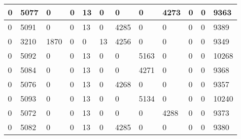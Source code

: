 \begin{longtable}{ | l | l | l | l | l | l | l | l | l | l | l || l |  }
	0 & 5077 & 0 & 0 & 13 & 0 & 0 & 0 & 4273 & 0 & 0 & 9363 \\ \hline
	0 & 5091 & 0 & 0 & 13 & 0 & 4285 & 0 & 0 & 0 & 0 & 9389 \\ \hline
	0 & 3210 & 1870 & 0 & 0 & 13 & 4256 & 0 & 0 & 0 & 0 & 9349 \\ \hline
	0 & 5092 & 0 & 0 & 13 & 0 & 0 & 5163 & 0 & 0 & 0 & 10268 \\ \hline
	0 & 5084 & 0 & 0 & 13 & 0 & 0 & 4271 & 0 & 0 & 0 & 9368 \\ \hline
	0 & 5076 & 0 & 0 & 13 & 0 & 4268 & 0 & 0 & 0 & 0 & 9357 \\ \hline
	0 & 5093 & 0 & 0 & 13 & 0 & 0 & 5134 & 0 & 0 & 0 & 10240 \\ \hline
	0 & 5072 & 0 & 0 & 13 & 0 & 0 & 0 & 4288 & 0 & 0 & 9373 \\ \hline
	0 & 5082 & 0 & 0 & 13 & 0 & 4285 & 0 & 0 & 0 & 0 & 9380 \\ \hline
\end{longtable}

